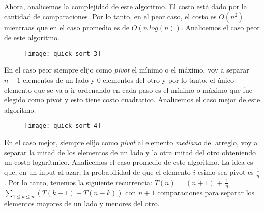 \documentclass[10pt,a4paper]{article}
\begin{document}
Ahora, analicemos la complejidad de este algoritmo.
\newline
\newline
El costo está dado por la cantidad de comparaciones. Por lo tanto, en el peor caso, el costo es $O(n^{2})$ mientraas que en el caso promedio es de $O(n~log(n))$.
\newline
\newline
Analicemos el caso peor de este algoritmo.
\newline
\newline
\begin{figure}[h]
	\centering
\texttt{[image: quick-sort-3]}
	\label{drivers1}
\end{figure}
\newline
\newline
\newline
En el caso peor siempre elijo como \textit{pivot} el mínimo o el máximo, voy a separar $n-1$ elementos de un lado y 0 elementos del otro y por lo tanto, el único elemento que se va a ir ordenando en cada paso es el mínimo o máximo que fue elegido como pivot y esto tiene costo cuadratico.
\newline
\newline
Analicemos el caso mejor de este algoritmo.
\newline
\newline
\begin{figure}[h]
	\centering
\texttt{[image: quick-sort-4]}
	\label{drivers1}
\end{figure}
\newline
\newline
\newline
En el caso mejor, siempre elijo como \textit{pivot} al elemento \textit{mediano} del arreglo, voy a separar la mitad de los elementos de un lado y la otra mitad del otro obteniendo un costo logarítmico. 
\newpage
Analicemos el caso promedio de este algoritmo.
\newline
\newline
La idea es que, en un input al azar, la probabilidad de que el elemento $i$-esimo sea pivot es $\displaystyle \frac{1}{n}$.
\newline
\newline
Por lo tanto, tenemos la siguiente recurrencia:
\newline
\newline
$T(n)$ = $(n+1)$ + $\displaystyle \frac{1}{n}$ $\displaystyle \sum_{1 \leq k \leq n}^{} (T(k-1) + T(n-k))$ con $n+1$ comparaciones para separar los elementos mayores de un lado y menores del otro.
\end{document}
